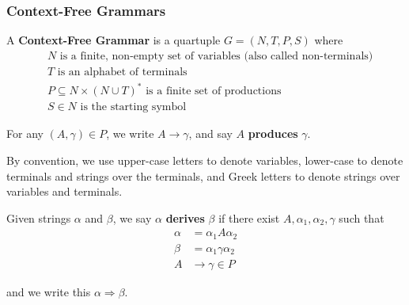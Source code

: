 \subsubsection{Context-Free Grammars}\label{subsec:context-free-grammars}
\begin{definition}
    A \textbf{Context-Free Grammar} is a quartuple $G=(N, T, P, S)$ where 
          \begin{align*}
                & N\text{ is a finite, non-empty set of variables (also called non-terminals)}\\
                & T\text{ is an alphabet of terminals}\\
                & P\subseteq N\times(N\cup T)^*\text{ is a finite set of productions}\\
                & S\in N\text{ is the starting symbol}
          \end{align*}

          For any $(A, \gamma)\in P$, we write $A\to\gamma$, and say $A$ \textbf{produces} $\gamma$. 
\end{definition}

By convention, we use upper-case letters to denote variables, lower-case to denote terminals and strings over the terminals, and Greek letters to denote strings over variables and terminals.

\begin{definition}
    Given strings $\alpha$ and $\beta$, we say $\alpha$ \textbf{derives} $\beta$ if there exist $A, \alpha_1,\alpha_2,\gamma$ such that 
    \begin{align*}
          \alpha &= \alpha_1A\alpha_2\\
          \beta  &= \alpha_1\gamma\alpha_2\\
          A&\to \gamma\in P
    \end{align*}

    and we write this $\alpha\Rightarrow\beta$. 
\end{definition}